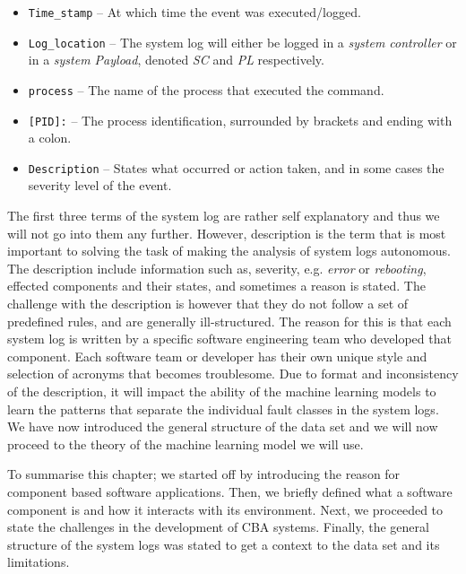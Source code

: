 \begin{itemize}[leftmargin=4em,align=left]
    
    \item \verb|Time_stamp| -- At which time the event was executed/logged.
    
    \item \verb|Log_location| -- The system log will either be logged in a \textit{system controller} or in a \textit{system Payload}, denoted \textit{SC} and \textit{PL} respectively.
    
    \item \verb|process| -- The name of the process that executed the command.
    
    \item \verb|[PID]:| -- The process identification, surrounded by brackets and ending with a colon.
    
    \item \verb|Description| -- States what occurred or action taken, and in some cases the severity level of the event.

\end{itemize}

\noindent The first three terms of the system log are rather self explanatory and thus we will not go into them any further. However, description is the term that is most important to solving the task of making the analysis of system logs autonomous. The description include information such as, severity, e.g. \textit{error} or \textit{rebooting}, effected components and their states, and sometimes a reason is stated. The challenge with the description is however that they do not follow a set of predefined rules, and are generally ill-structured. The reason for this is that each system log is written by a specific software engineering team who developed that component. Each software team or developer has their own unique style and selection of acronyms that becomes troublesome. Due to format and inconsistency of the description, it will impact the ability of the machine learning models to learn the patterns that separate the individual fault classes in the system logs. We have now introduced the general structure of the data set and we will now proceed to the theory of the machine learning model we will use.


To summarise this chapter; we started off by introducing the reason for component based software applications. Then, we briefly defined what a software component is and how it interacts with its environment. Next, we proceeded to state the challenges in the development of CBA systems. Finally, the general structure of the system logs was stated to get a context to the data set and its limitations.